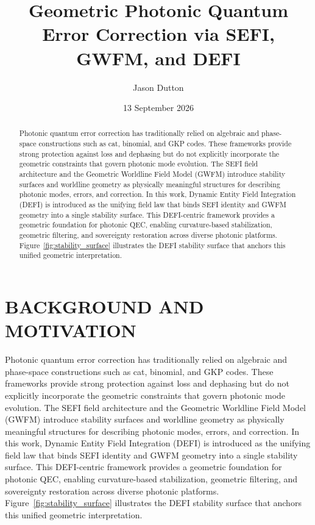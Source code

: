 \documentclass[aip,adv,reprint,floatfix]{revtex4-2}
\begin{document}
\title{Geometric Photonic Quantum Error Correction via SEFI, GWFM, and DEFI}

\author{Jason Dutton}

\date{13 September 2026}

\begin{abstract}
Photonic quantum error correction has traditionally relied on algebraic and phase-space constructions such as
cat, binomial, and GKP codes.\cite{DuttonSEFI2026,DuttonElectronField2026} These frameworks provide strong protection against loss and dephasing but
do not explicitly incorporate the geometric constraints that govern photonic mode evolution. The SEFI field
architecture\cite{DuttonSEFI2026} and the Geometric Worldline Field Model (GWFM)\cite{DuttonElectronField2026} introduce stability surfaces and worldline
geometry as physically meaningful structures for describing photonic modes, errors, and correction. In this
work, Dynamic Entity Field Integration (DEFI) is introduced as the unifying field law that binds SEFI identity
and GWFM geometry into a single stability surface. This DEFI-centric framework provides a geometric
foundation for photonic QEC, enabling curvature-based stabilization, geometric filtering, and sovereignty
restoration across diverse photonic platforms. Figure~\ref{fig:stability_surface} illustrates the DEFI stability
surface that anchors this unified geometric interpretation.
\end{abstract}

\maketitle

\section{BACKGROUND AND MOTIVATION}

Photonic quantum error correction has traditionally relied on algebraic and phase-space constructions such as
cat, binomial, and GKP codes.\cite{DuttonSEFI2026,DuttonElectronField2026} These frameworks provide strong protection against loss and dephasing but
do not explicitly incorporate the geometric constraints that govern photonic mode evolution. The SEFI field
architecture\cite{DuttonSEFI2026} and the Geometric Worldline Field Model (GWFM)\cite{DuttonElectronField2026} introduce stability surfaces and worldline
geometry as physically meaningful structures for describing photonic modes, errors, and correction. In this
work, Dynamic Entity Field Integration (DEFI) is introduced as the unifying field law that binds SEFI identity
and GWFM geometry into a single stability surface. This DEFI-centric framework provides a geometric
foundation for photonic QEC, enabling curvature-based stabilization, geometric filtering, and sovereignty
restoration across diverse photonic platforms. Figure~\ref{fig:stability_surface} illustrates the DEFI stability
surface that anchors this unified geometric interpretation.
\end{document}
